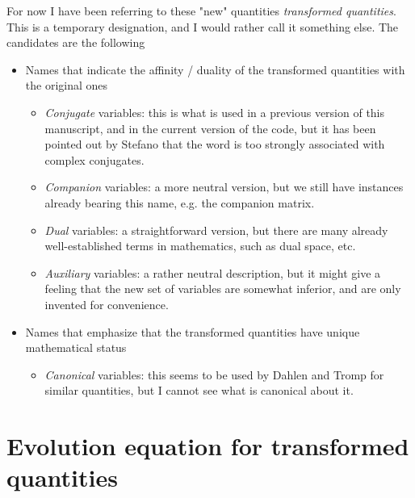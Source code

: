 \begin{todoremark}
For now I have been referring to these "new" quantities \textit{transformed quantities}. This is a temporary designation, and I would rather call it something else. The candidates are the following
\begin{itemize}
    \item Names that indicate the affinity / duality of the transformed quantities with the original ones
    \begin{itemize}
        \item \textit{Conjugate} variables: this is what is used in a previous version of this manuscript, and in the current version of the code, but it has been pointed out by Stefano that the word is too strongly associated with complex conjugates.
        \item \textit{Companion} variables: a more neutral version, but we still have instances already bearing this name, e.g. the companion matrix.
        \item \textit{Dual} variables: a straightforward version, but there are many already well-established terms in mathematics, such as dual space, etc.
        \item \textit{Auxiliary} variables: a rather neutral description, but it might give a feeling that the new set of variables are somewhat inferior, and are only invented for convenience.
    \end{itemize}
    \item Names that emphasize that the transformed quantities have unique mathematical status
    \begin{itemize}
        \item \textit{Canonical} variables: this seems to be used by Dahlen and Tromp for similar quantities, but I cannot see what is canonical about it.
    \end{itemize}
\end{itemize}
\end{todoremark}


\section{Evolution equation for transformed quantities}\label{sec:evo-canonical}

